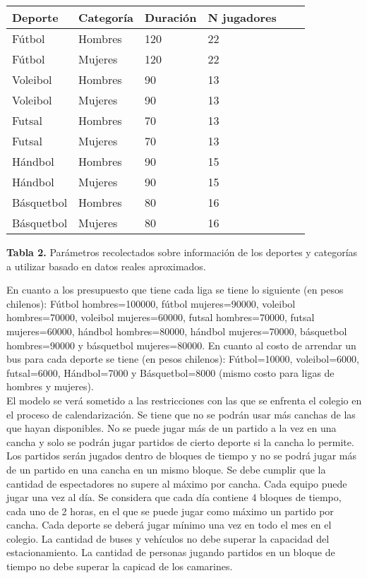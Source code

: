 \begin{center}
\begin{tabular}{|l|l|l|l|l|l|}
\hline
Deporte & Categoría& Duración & N jugadores  \\
\hline \hline
Fútbol & Hombres & 120  & 22   \\ \hline
Fútbol & Mujeres & 120 & 22  \\ \hline
Voleibol & Hombres & 90 & 13    \\ \hline
Voleibol & Mujeres & 90 & 13   \\ \hline
Futsal & Hombres & 70 & 13  \\ \hline
Futsal & Mujeres & 70 & 13  \\ \hline
Hándbol & Hombres & 90 & 15  \\ \hline
Hándbol & Mujeres & 90 & 15  \\ \hline
Básquetbol & Hombres & 80 & 16   \\ \hline
Básquetbol & Mujeres & 80 & 16  \\ \hline
\end{tabular}

\vspace{5pt}
\begin{flushleft}
\footnotesize{\textbf{Tabla 2.} Parámetros recolectados sobre información de los deportes y categorías a utilizar basado en datos reales aproximados.}
\end{flushleft}
\end{center}

\indent En cuanto a los presupuesto que tiene cada liga se tiene lo siguiente (en pesos chilenos): Fútbol hombres=100000, fútbol mujeres=90000, voleibol hombres=70000, voleibol mujeres=60000, futsal hombres=70000, futsal mujeres=60000, hándbol hombres=80000, hándbol mujeres=70000, básquetbol hombres=90000 y básquetbol mujeres=80000.
En cuanto al costo de arrendar un bus para cada deporte se tiene (en pesos chilenos): Fútbol=10000, voleibol=6000, futsal=6000, Hándbol=7000 y Básquetbol=8000 (mismo costo para ligas de hombres y  mujeres).\\
\indent El modelo se verá sometido a las restricciones con las que se enfrenta el colegio en el proceso de calendarización. Se tiene que no se podrán usar más canchas de las que hayan disponibles. No se puede jugar más de un partido a la vez en una cancha y solo se podrán jugar partidos de cierto deporte si la cancha lo permite. Los partidos serán jugados dentro de bloques de tiempo y no se podrá jugar más de un partido en una cancha en un mismo bloque. Se debe cumplir que la cantidad de espectadores no supere al máximo por cancha. Cada equipo puede jugar una vez al día. Se considera que cada día contiene 4 bloques de tiempo, cada uno de 2 horas, en el que se puede jugar como máximo un partido por cancha. Cada deporte se deberá jugar mínimo una vez en todo el mes en el colegio. La cantidad de buses y vehículos no debe superar la capacidad del estacionamiento. La cantidad de personas jugando partidos en un bloque de tiempo no debe superar la capicad de los camarines.

